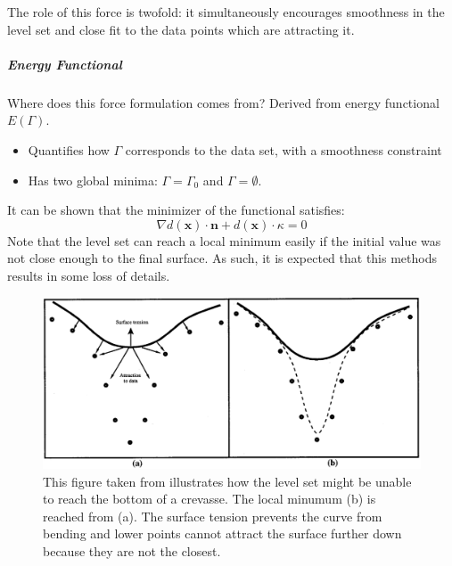 \documentclass{article}
\begin{document}
The role of this force is twofold: it simultaneously encourages smoothness in
the level set and close fit to the data points which are attracting it.

\subparagraph{Energy Functional}
Where does this force formulation comes from? Derived from energy functional
$E(\Gamma)$.
\begin{itemize}
\item Quantifies how $\Gamma$ corresponds to the data set, with a smoothness
    constraint
\item Has two global minima: $\Gamma = \Gamma_0$  and $\Gamma = \emptyset$.
\end{itemize}
It can be shown that the minimizer of the functional satisfies:
\[
\nabla d(\mathbf{x}) \cdot \mathbf{n} + d(\mathbf{x}) \cdot \kappa = 0
\]
Note that the level set can reach a local minimum easily if the initial value
was not close enough to the final surface. As such, it is expected that this
methods results in some loss of details.
\begin{figure}[H]
  \centering
  \includegraphics[width=1.0\textwidth]{img/savadjiev3_3.png}
  \caption{This figure taken from \cite{savadjiev2003surface} illustrates
  how the level set might be unable to reach the bottom of a crevasse. The local
  minumum (b) is reached from (a). The surface tension prevents the curve from
  bending and lower points cannot attract the surface further down because they
  are not the closest.}    
\end{figure}



\end{document}
